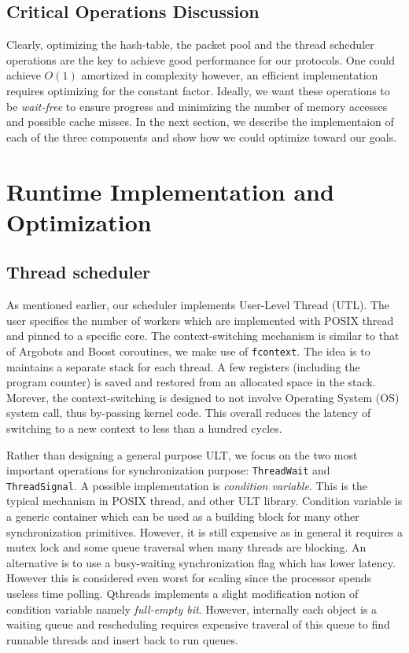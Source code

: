 \documentclass{sig-alternate-05-2015}
\begin{document}
\subsection{Critical Operations Discussion}
Clearly, optimizing the hash-table, the packet pool and the thread scheduler
operations are the key to achieve good performance for our protocols. One could
achieve $O(1)$ amortized in complexity however, an efficient implementation
requires optimizing for the constant factor. Ideally, we want these operations
to be \textit{wait-free} to ensure progress and minimizing the number of memory
accesses and possible cache misses. In the next section, we describe the
implementaion of each of the three components and show how we could optimize
toward our goals.

\section{Runtime Implementation and Optimization}
\label{sec:impl}
\subsection{Thread scheduler}
As mentioned earlier, our scheduler implements User-Level Thread (UTL). The
user specifies the number of workers which are implemented with POSIX thread
and pinned to a specific core. The context-switching mechanism is similar to
that of Argobots and Boost coroutines, we make use of \texttt{fcontext}. The
idea is to maintains a separate stack for each thread. A few registers
(including the program counter) is saved and restored from an allocated space
in the stack. Morever, the context-switching is designed to not involve
Operating System (OS) system call, thus by-passing kernel code. This overall
reduces the latency of switching to a new context to less than a hundred
cycles.

Rather than designing a general purpose ULT, we focus on the two most important
operations for synchronization purpose: \texttt{ThreadWait} and
\texttt{ThreadSignal}. A possible implementation is \textit{condition
variable}. This is the typical mechanism in POSIX thread, and other ULT
library.  Condition variable is a generic container which can
be used as a building block for many other synchronization primitives. However,
it is still expensive as in general it requires a mutex lock and some queue
traversal when many threads are blocking.  An alternative is to use a
busy-waiting synchronization flag which has lower latency. However this is
considered even worst for scaling since the processor spends useless time
polling. Qthreads implements a slight modification notion of condition variable
namely \textit{full-empty bit}. However, internally each object is a waiting
queue and rescheduling requires expensive traveral of this queue to find
runnable threads and insert back to run queues.
\end{document}
